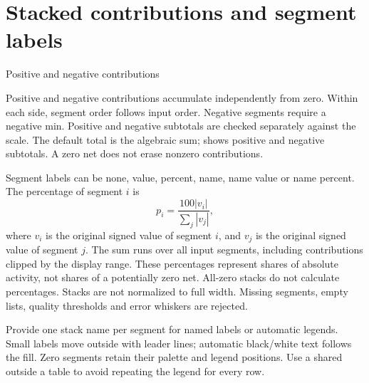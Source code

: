 \section{Stacked contributions and segment labels}
\begin{demo}{Positive and negative contributions}
\end{demo}
Positive and negative contributions accumulate independently from zero. Within
each side, segment order follows input order. Negative segments require a negative
min. Positive and negative subtotals are checked separately against the scale.
The default total is the algebraic sum;  shows positive
and negative subtotals. A zero net does not erase nonzero contributions.

Segment labels can be none, value, percent, name, name value or name percent.
The percentage of segment $i$ is
\[
  p_i=\frac{100|v_i|}{\sum_j|v_j|},
\]
where $v_i$ is the original signed value of segment $i$, and $v_j$ is the
original signed value of segment $j$. The sum runs over all input segments,
including contributions clipped by the display range. These percentages
represent shares of absolute activity, not shares of a potentially zero net.
All-zero stacks do not calculate percentages. Stacks are not normalized to full
width. Missing segments, empty lists, quality thresholds and error whiskers are rejected.

Provide one stack name per segment for named labels or automatic legends.
Small labels move outside with leader lines; automatic black/white text follows
the fill. Zero segments retain their palette and legend positions. Use a shared
\key{\gradbarslegend} outside a table to avoid repeating the legend for every row.
